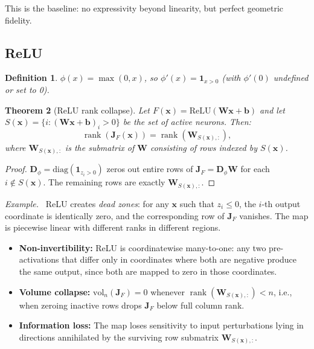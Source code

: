 \documentclass[11pt,a4paper]{article}
\newtheorem{theorem}{Theorem}
\newtheorem{definition}[theorem]{Definition}
\theoremstyle{remark}
\newenvironment{pathology}{\par\medskip\noindent\textit{Example.}\ }{\par\medskip}
\begin{document}
This is the baseline: no expressivity beyond linearity, but perfect geometric fidelity.

\subsection{ReLU}

\begin{definition}
$\phi(x) = \max(0, x)$, so $\phi'(x) = \mathbf{1}_{x > 0}$ (with $\phi'(0)$ undefined or set to 0).
\end{definition}

\begin{theorem}[ReLU rank collapse]
\label{thm:relu-collapse}
Let $F(\mathbf{x}) = \mathrm{ReLU}(\mathbf{W}\mathbf{x} + \mathbf{b})$ and let $S(\mathbf{x}) = \{i : (\mathbf{W}\mathbf{x}+\mathbf{b})_i > 0\}$ be the set of active neurons.
Then:
\begin{equation}
  \operatorname{rank}(\mathbf{J}_F(\mathbf{x})) = \operatorname{rank}(\mathbf{W}_{S(\mathbf{x}), :}),
  \label{eq:relu-rank}
\end{equation}
where $\mathbf{W}_{S(\mathbf{x}),:}$ is the submatrix of $\mathbf{W}$ consisting of rows indexed by $S(\mathbf{x})$.
\end{theorem}

\begin{proof}
$\mathbf{D}_\phi = \mathrm{diag}(\mathbf{1}_{z_i > 0})$ zeros out entire rows of $\mathbf{J}_F = \mathbf{D}_\phi \mathbf{W}$ for each $i \notin S(\mathbf{x})$.
The remaining rows are exactly $\mathbf{W}_{S(\mathbf{x}),:}$.
\end{proof}

\begin{pathology}
ReLU creates \emph{dead zones}: for any $\mathbf{x}$ such that $z_i \leq 0$, the $i$-th output coordinate is identically zero, and the corresponding row of $\mathbf{J}_F$ vanishes.
The map is piecewise linear with different ranks in different regions.
\begin{itemize}
  \item \textbf{Non-invertibility:} ReLU is coordinatewise many-to-one: any two pre-activations that differ only in coordinates where both are negative produce the same output, since both are mapped to zero in those coordinates.
  \item \textbf{Volume collapse:} $\mathrm{vol}_n(\mathbf{J}_F) = 0$ whenever $\operatorname{rank}(\mathbf{W}_{S(\mathbf{x}),:}) < n$, i.e., when zeroing inactive rows drops $\mathbf{J}_F$ below full column rank.
  \item \textbf{Information loss:} The map loses sensitivity to input perturbations lying in directions annihilated by the surviving row submatrix $\mathbf{W}_{S(\mathbf{x}),:}$.
\end{itemize}
\end{pathology}
\end{document}

